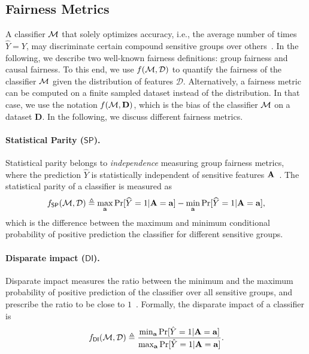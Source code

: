 \subsection*{Fairness Metrics}

A classifier $\mathcal{M}$ that solely optimizes accuracy, i.e., the average number of times $\hat{Y} = Y$, may discriminate certain compound sensitive groups over others~\cite{chouldechova2020snapshot}. In the following, we describe two well-known fairness definitions: group fairness and causal fairness. To this end, we use $ f(\mathcal{M}, \mathcal{D}) $ to quantify the fairness of the classifier $ \mathcal{M} $ given the distribution of features $ \mathcal{D} $. Alternatively, a fairness metric can be computed on a finite sampled dataset instead of the distribution. In that case, we use the notation $ f(\mathcal{M}, \mathbf{D}) $, which is the bias of the classifier $ \mathcal{M} $ on a dataset $ \mathbf{D} $. In the following, we discuss different fairness metrics.


\paragraph{Statistical Parity ($ \mathsf{SP} $).} Statistical parity belongs to \textit{independence} measuring group fairness metrics, where the prediction $ \widehat{Y} $ is statistically independent of sensitive features $ \mathbf{A} $~\cite{feldman2015certifying}.  The statistical parity of  a classifier is measured as 
\[ f_{\mathsf{SP}}(\mathcal{M}, \mathcal{D}) \triangleq \max_{\mathbf{a}}\Pr[\widehat{Y} =1 | \mathbf{A} = \mathbf{a}] - \min_{\mathbf{a}}\Pr[\widehat{Y} =1 | \mathbf{A} = \mathbf{a}], \] which is the difference between the maximum and minimum conditional probability of positive prediction the classifier for different sensitive groups.


\paragraph{Disparate impact ($ \mathsf{DI} $).} Disparate impact measures the ratio between the minimum and the maximum probability of positive prediction of the classifier over all sensitive groups, and prescribe the ratio to be close to $1$~\cite{feldman2015certifying}.  Formally, the disparate impact of a classifier is 
\[
f_{\mathsf{DI}}(\mathcal{M}, \mathcal{D}) \triangleq \frac{\min_{\mathbf{a}} \Pr[\hat{Y} =1 | \mathbf{A} =  \mathbf{a}]}{\max_{\mathbf{a}} \Pr[\hat{Y} =1 | \mathbf{A} =  \mathbf{a}]}.
\]

	

